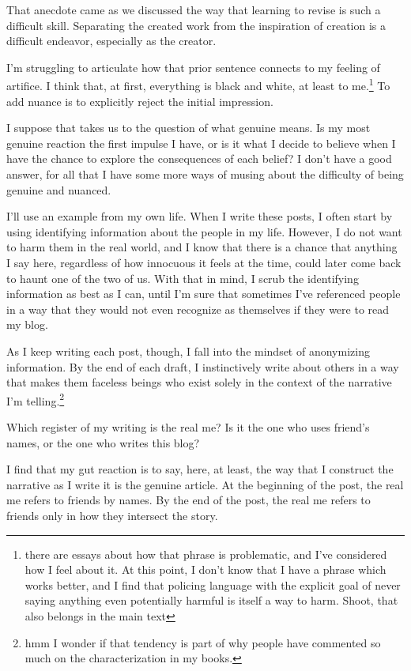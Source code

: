 \documentclass[12pt]{article}[titlepage]
\newcommand{\1}{\={a}}
\newcommand{\2}{\={e}}
\newcommand{\3}{\={\i}}
\newcommand{\4}{\=o}
\newcommand{\5}{\=u}
\newcommand{\6}{\={A}}
\renewcommand{\,}{\textsuperscript{,}}
\begin{document}
That anecdote came as we discussed the way that learning to revise is such a difficult skill.
Separating the created work from the inspiration of creation is a difficult endeavor, especially as the creator.

I'm struggling to articulate how that prior sentence connects to my feeling of artifice.
I think that, at first, everything is black and white, at least to me.\footnote{there are essays about how that phrase is problematic, and I've considered how I feel about it.
At this point, I don't know that I have a phrase which works better, and I find that policing language with the explicit goal of never saying anything even potentially harmful is itself a way to harm.
Shoot, that also belongs in the main text}
To add nuance is to explicitly reject the initial impression.

I suppose that takes us to the question of what genuine means.
Is my most genuine reaction the first impulse I have, or is it what I decide to believe when I have the chance to explore the consequences of each belief?
I don't have a good answer, for all that I have some more ways of musing about the difficulty of being genuine and nuanced.

I'll use an example from my own life.
When I write these posts, I often start by using identifying information about the people in my life.
However, I do not want to harm them in the real world, and I know that there is a chance that anything I say here, regardless of how innocuous it feels at the time, could later come back to haunt one of the two of us.
With that in mind, I scrub the identifying information as best as I can, until I'm sure that sometimes I've referenced people in a way that they would not even recognize as themselves if they were to read my blog.

As I keep writing each post, though, I fall into the mindset of anonymizing information.
By the end of each draft, I instinctively write about others in a way that makes them faceless beings who exist solely in the context of the narrative I'm telling.\footnote{hmm I wonder if that tendency is part of why people have commented so much on the characterization in my books.}

Which register of my writing is the real me?
Is it the one who uses friend's names, or the one who writes this blog?

I find that my gut reaction is to say, here, at least, the way that I construct the narrative as I write it is the genuine article.
At the beginning of the post, the real me refers to friends by names.
By the end of the post, the real me refers to friends only in how they intersect the story.
\end{document}
